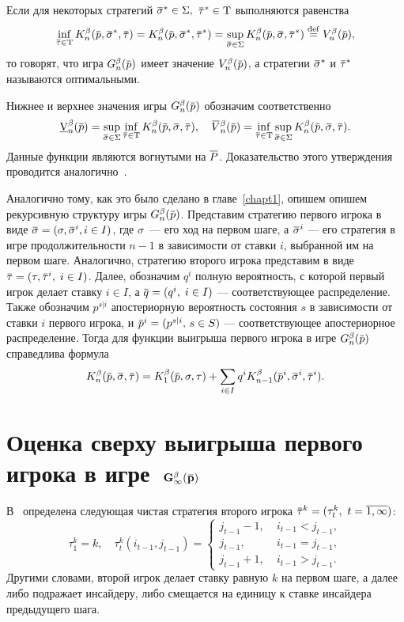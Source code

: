 {Если для некоторых стратегий $\sigmav^* \in \Sigma,$ $\tauv^* \in \Tau$ выполняются равенства
\begin{equation*}
  \inf_{\tauv \in \Tau} \K(\p, \sigmav^*, \tauv) =
  \K(\p, \sigmav^*, \tauv^*) =
  \sup_{\sigmav \in \Sigma} \K(\p, \sigmav, \tauv^*) \eqdef
  \V(\p),
\end{equation*}
то говорят, что игра $\theG(\p)$ имеет значение $\V(\p)$, а стратегии $\sigmav^*$ и $\tauv^*$
называются оптимальными.

Нижнее и верхнее значения игры $\theG(\p)$ обозначим соответственно
\begin{equation*}
  \LowV(\p) =
    \sup_{\sigmav \in \Sigma}
    \inf_{\tauv \in \Tau}
    \K(\p, \sigmav, \tauv), \quad
  \HighV(\p) =
    \inf_{\tauv \in \Tau}
    \sup_{\sigmav \in \Sigma}
    \K(\p, \sigmav, \tauv).
\end{equation*}
Данные функции являются вогнутыми на $\overline{P}$.
Доказательство этого утверждения проводится аналогично~\cite{domansky07}.

Аналогично тому, как это было сделано в главе~\ref{chapt1}, опишем опишем рекурсивную структуру игры $\theG(\p)$.
Представим стратегию первого игрока в виде $\sigmav = (\sigma, \sigmav^i, i \in I)$, где $\sigma$~--- его ход на первом шаге, а $\sigmav^i$ --- его стратегия в игре продолжительности $n-1$ в зависимости от ставки $i$, выбранной им на первом шаге.
Аналогично, стратегию второго игрока представим в виде $\tauv = (\tau, \tauv^i, \; i \in I)$.
%
Далее, обозначим $q^i$ полную вероятность, с которой первый игрок делает ставку $i \in I$, а $\q = (q^i, \; i \in I)$ --- соответствующее распределение.
Также обозначим $p^{s|i}$ апостериорную вероятность состояния $s$ в зависимости от ставки $i$ первого игрока, и $\p^i = (p^{s|i}, \, s \in S)$ --- соответствующее апостериорное распределение.
Тогда для функции выигрыша первого игрока в игре $\theG[n](\p)$ справедлива формула
\begin{equation*}
  \K[n](\p, \sigmav, \tauv) =
  \K[1](\p, \sigma, \tau) +
  \sum_{i \in I} q^i \K[n-1](\p^i, \sigmav^i, \tauv^i).
\end{equation*}

\section{Оценка сверху выигрыша первого игрока в игре~$\mathbf{G^\beta_\infty(\p)}$}
\label{ch2:sec:upper-bound}

В~\cite{domansky11} определена следующая чистая стратегия второго игрока $\tauv^k = (\tau^k_t,\ t = \overline{1, \infty})$:
\begin{equation*}
  \tau^k_1 = k, \quad
  \tau^k_t(i_{t-1}, j_{t-1}) = \begin{cases}
    j_{t-1} - 1, &\; i_{t-1} < j_{t-1},\\
    j_{t-1}, &\; i_{t-1} = j_{t-1},\\
    j_{t-1}+1, &\; i_{t-1} > j_{t-1}.
  \end{cases}
\end{equation*}
Другими словами, второй игрок делает ставку равную $k$ на первом шаге, а далее либо подражает инсайдеру, либо смещается на единицу к ставке инсайдера предыдущего шага.

}
